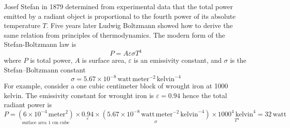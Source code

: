 \documentclass[12pt]{article}
\begin{document}
\noindent
Josef Stefan in 1879 determined from experimental data that the total power
emitted by a radiant object is proportional
to the fourth power of its absolute temperature $T$.
Five years later Ludwig Boltzmann showed how to derive the same relation from principles of thermodynamics.
The modern form of the Stefan-Boltzmann law is
$$
P=A\varepsilon\sigma T^4
$$
where $P$ is total power, $A$ is surface area, $\varepsilon$ is an emissivity constant,
and $\sigma$ is the Stefan--Boltzmann constant
$$
\sigma=5.67\times10^{-8}\,\text{watt}\,\text{meter}^{-2}\,\text{kelvin}^{-4}
$$
For example, consider a one cubic centimeter block of wrought iron at 1000 kelvin.
The emissivity constant for wrought iron is $\varepsilon=0.94$
hence the total radiant power is
\begin{equation*}
P=
\underset{\text{surface area 1 cm cube}}
{(6\times10^{-4}\,\text{meter}^2)}
\times
\underset{\varepsilon}
{0.94}
\times
\underset{\sigma}
{(5.67\times10^{-8}\,\text{watt}\,\text{meter}^{-2}\,\text{kelvin}^{-4})}
\times
\underset{T^4}
{1000^4\,\text{kelvin}^4}
=32\,\text{watt}
\end{equation*}
\end{document}
